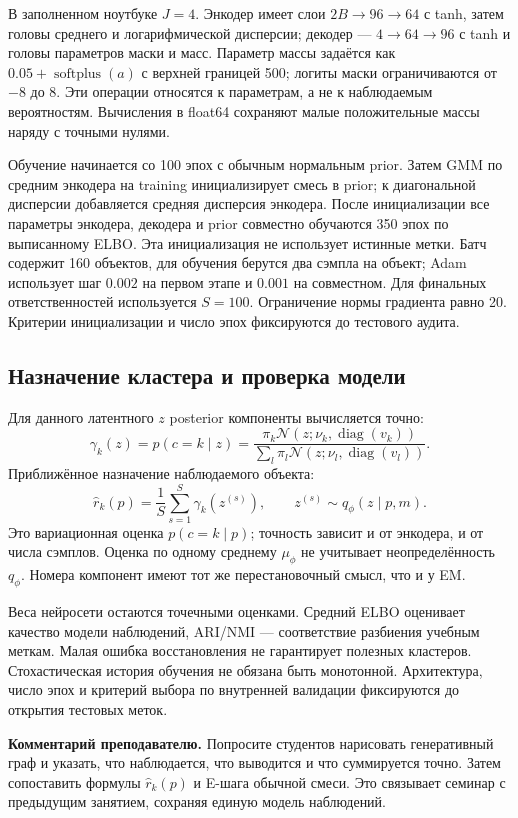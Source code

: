 \documentclass[11pt,a4paper]{article}
\newcommand{\Normal}{\mathcal N}
\newcommand{\diag}{\operatorname{diag}}
\newcommand{\teach}[1]{\par\textbf{Комментарий преподавателю.} #1\par}
\begin{document}
В заполненном ноутбуке $J=4$. Энкодер имеет слои $2B\to96\to64$
с tanh, затем головы среднего и логарифмической дисперсии; декодер ---
$4\to64\to96$ с tanh и головы параметров маски и масс.
Параметр массы задаётся как $0.05+\operatorname{softplus}(a)$ с верхней
границей 500; логиты маски ограничиваются от $-8$ до 8.
Эти операции относятся к параметрам, а не к наблюдаемым вероятностям.
Вычисления в float64 сохраняют малые положительные массы наряду
с точными нулями.

Обучение начинается со 100 эпох с обычным нормальным prior.
Затем GMM по средним энкодера на training инициализирует смесь в prior;
к диагональной дисперсии добавляется средняя дисперсия энкодера.
После инициализации все параметры энкодера, декодера и prior совместно
обучаются 350 эпох по выписанному ELBO. Эта инициализация не использует
истинные метки. Батч содержит 160 объектов, для обучения берутся два
сэмпла на объект; Adam использует шаг $0.002$ на первом этапе и $0.001$
на совместном. Для финальных ответственностей используется $S=100$.
Ограничение нормы градиента равно 20. Критерии инициализации и число эпох
фиксируются до тестового аудита.

\subsection{Назначение кластера и проверка модели}
Для данного латентного $z$ posterior компоненты вычисляется точно:
\[
 \gamma_k(z)=p(c=k\mid z)=
 \frac{\pi_k\Normal(z;\nu_k,\diag(v_k))}
 {\sum_l\pi_l\Normal(z;\nu_l,\diag(v_l))}.
\]
Приближённое назначение наблюдаемого объекта:
\[
 \widehat r_k(p)=\frac1S\sum_{s=1}^S\gamma_k(z^{(s)}),\qquad
 z^{(s)}\sim q_\phi(z\mid p,m).
\]
Это вариационная оценка $p(c=k\mid p)$; точность зависит и от
энкодера, и от числа сэмплов. Оценка по одному среднему $\mu_\phi$
не учитывает неопределённость $q_\phi$. Номера компонент имеют тот же
перестановочный смысл, что и у EM.

Веса нейросети остаются точечными оценками. Средний ELBO оценивает качество
модели наблюдений, ARI/NMI --- соответствие разбиения учебным меткам.
Малая ошибка восстановления не гарантирует полезных кластеров.
Стохастическая история обучения не обязана быть монотонной.
Архитектура, число эпох и критерий выбора по внутренней валидации
фиксируются до открытия тестовых меток.

\teach{Попросите студентов нарисовать генеративный граф и указать,
что наблюдается, что выводится и что суммируется точно. Затем сопоставить
формулы $\widehat r_k(p)$ и E-шага обычной смеси. Это связывает
семинар с предыдущим занятием, сохраняя единую модель наблюдений.}
\end{document}
